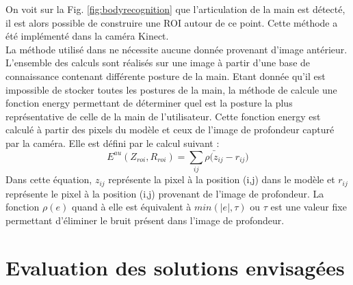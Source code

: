 \newpage

On voit sur la Fig. \ref{fig:bodyrecognition} que l'articulation de la main est détecté, il est alors possible de construire
une ROI autour de ce point. Cette méthode a été implémenté dans la caméra Kinect.\\

La méthode utilisé dans \cite{export:238453} ne nécessite aucune donnée provenant d'image antérieur. L'ensemble
des calculs sont réalisés sur une image à partir d'une base de connaissance contenant différente posture de la
main. Etant donnée qu'il est impossible de stocker toutes les postures de la main, la méthode de \cite{export:238453}
calcule une fonction energy permettant de déterminer quel est la posture la plus représentative de celle de la main
de l'utilisateur. Cette fonction energy est calculé à partir des pixels du modèle et ceux de l'image de profondeur
capturé par la caméra. Elle est défini par le calcul suivant :
\begin{equation}
 E^{au}(Z_{roi}, R_{roi}) = \sum_{ij} \bar{\rho(z_{ij}} - r_{ij})
\end{equation}
Dans cette équation, $z_{ij}$ représente la pixel à la position (i,j) dans le modèle et $r_{ij}$ représente le pixel à la position (i,j)
provenant de l'image de profondeur. La fonction $\rho(e)$ quand à elle est équivalent à $min(|e|,\tau)$ ou $\tau$ est une valeur fixe permettant
d'éliminer le bruit présent dans l'image de profondeur.

\section{Evaluation des solutions envisagées}
